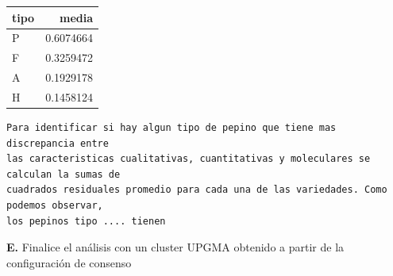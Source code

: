 \documentclass[
]{article}
\begin{document}
\begin{table}
\centering\begingroup\fontsize{12}{14}\selectfont

\begin{tabular}{l|r}
\hline
tipo & media\\
\hline
P & 0.6074664\\
\hline
F & 0.3259472\\
\hline
A & 0.1929178\\
\hline
H & 0.1458124\\
\hline
\end{tabular}
\endgroup{}
\end{table}

\begin{verbatim}
Para identificar si hay algun tipo de pepino que tiene mas discrepancia entre
las caracteristicas cualitativas, cuantitativas y moleculares se calculan la sumas de
cuadrados residuales promedio para cada una de las variedades. Como podemos observar, 
los pepinos tipo .... tienen 
\end{verbatim}

\textbf{E.} Finalice el análisis con un cluster UPGMA obtenido a partir
de la configuración de consenso
\end{document}
